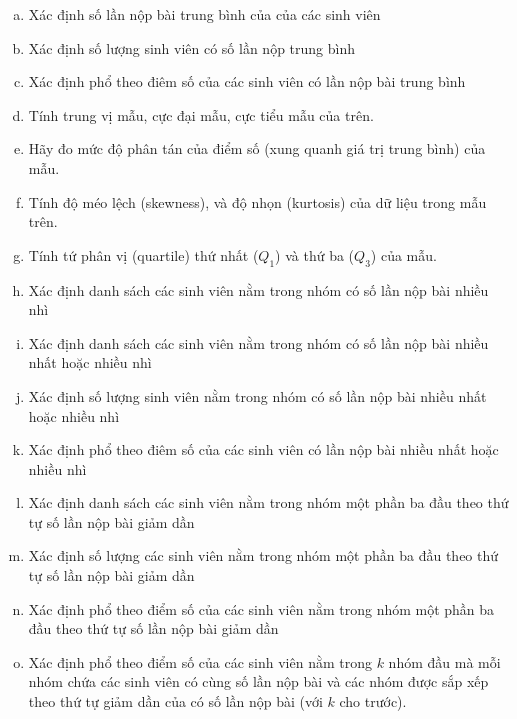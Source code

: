 \documentclass[a4paper]{article}
\theoremstyle{definition}
\begin{document}
\begin{itemize}
\begin{enumerate}[a)]
  \item Xác định số lần nộp bài trung bình của của các sinh viên 
  \item Xác định số lượng sinh viên có số lần nộp trung bình 
  \item {Xác định phổ theo điêm số của các sinh viên có lần nộp bài trung bình}
  \item Tính trung vị mẫu, cực đại mẫu, cực tiểu mẫu của trên.
  \item Hãy đo mức độ phân tán của điểm số (xung quanh giá trị trung bình) của  mẫu.
  \item  Tính độ méo lệch (skewness), và độ nhọn (kurtosis) của dữ liệu trong mẫu trên.
  \item Tính tứ phân vị (quartile) thứ nhất ($Q_1$) và thứ ba ($Q_3$) của mẫu.

  
  \item {Xác định danh sách các sinh viên nằm trong nhóm có số lần nộp bài nhiều nhì}
  \item {Xác định danh sách các sinh viên nằm trong nhóm có số lần nộp bài nhiều nhất hoặc nhiều nhì}
  \item {Xác định số lượng sinh viên nằm trong nhóm có số lần nộp bài nhiều nhất hoặc nhiều nhì}
  \item {Xác định phổ theo điêm số của các sinh viên có lần nộp bài nhiều nhất hoặc nhiều nhì}
  \item {Xác định danh sách các sinh viên nằm trong nhóm một phần ba đầu theo thứ tự số lần nộp bài giảm dần}
  \item {Xác định số lượng các sinh viên nằm trong nhóm một phần ba đầu theo thứ tự số lần nộp bài giảm dần}
  \item {Xác định phổ theo điểm số của các sinh viên nằm trong nhóm một phần ba đầu theo thứ tự số lần nộp bài giảm dần}
    \item {Xác định phổ theo điểm số của các sinh viên nằm trong $k$ nhóm đầu mà mỗi nhóm chứa các sinh viên có cùng số lần nộp bài và các nhóm được sắp xếp theo thứ tự giảm dần của có số lần nộp bài (với $k$ cho trước)}.
\end{enumerate}
    
    

\end{itemize}
\end{document}
